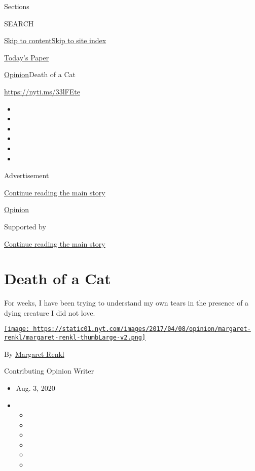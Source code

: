 Sections

SEARCH

\protect\hyperlink{site-content}{Skip to
content}\protect\hyperlink{site-index}{Skip to site index}

\href{https://myaccount.nytimes.com/auth/login?response_type=cookie\&client_id=vi}{}

\href{https://www.nytimes.com/section/todayspaper}{Today's Paper}

\href{/section/opinion}{Opinion}\textbar{}Death of a Cat

\url{https://nyti.ms/33lFEte}

\begin{itemize}
\item
\item
\item
\item
\item
\item
\end{itemize}

Advertisement

\protect\hyperlink{after-top}{Continue reading the main story}

\href{/section/opinion}{Opinion}

Supported by

\protect\hyperlink{after-sponsor}{Continue reading the main story}

\hypertarget{death-of-a-cat}{%
\section{Death of a Cat}\label{death-of-a-cat}}

For weeks, I have been trying to understand my own tears in the presence
of a dying creature I did not love.

\href{https://www.nytimes.com/by/margaret-renkl}{\texttt{[image: https://static01.nyt.com/images/2017/04/08/opinion/margaret-renkl/margaret-renkl-thumbLarge-v2.png]}}

By \href{https://www.nytimes.com/by/margaret-renkl}{Margaret Renkl}

Contributing Opinion Writer

\begin{itemize}
\item
  Aug. 3, 2020
\item
  \begin{itemize}
  \item
  \item
  \item
  \item
  \item
  \item
  \end{itemize}
\end{itemize}

